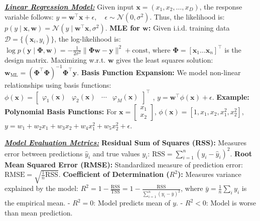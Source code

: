 \documentclass[10pt]{article}
\newcommand{\bulletPoint}[1]{\ul{\textit{\textbf{#1}}}}
\begin{document}
\begin{multicols*}{2}
\bulletPoint{Linear Regression Model:}\quad
Given input $\mathbf{x} = (x_1, x_2, \dots, x_D)$, the response variable follows:
$y = \mathbf{w}^\top \mathbf{x} + \epsilon, \quad \epsilon \sim \mathcal{N}(0, \sigma^2)$.
Thus, the likelihood is:
$p(y \mid \mathbf{x}, \mathbf{w}) = \mathcal{N}(y \mid \mathbf{w}^\top \mathbf{x}, \sigma^2)$. 
\textbf{MLE for $\mathbf{w}$:} Given i.i.d. training data $\mathcal{D} = \{(\mathbf{x}_i, y_i)\}$, the log-likelihood is:
$\log p(\mathbf{y} \mid \mathbf{\Phi}, \mathbf{w}) = -\frac{1}{2\sigma^2} \|\mathbf{\Phi} \mathbf{w} - \mathbf{y} \|^2 + \text{const}$,
where $\mathbf{\Phi} = [\mathbf{x}_1 \dots \mathbf{x}_n]^\top$ is the design matrix.
Maximizing w.r.t. $\mathbf{w}$ gives the least squares solution:
$\mathbf{w}_{\text{ML}} = (\mathbf{\Phi}^\top \mathbf{\Phi})^{-1} \mathbf{\Phi}^\top \mathbf{y}$. 
\textbf{Basis Function Expansion:} We model non-linear relationships using basis functions:
$
\phi(\mathbf{x}) =
\begin{bmatrix}
\varphi_1(\mathbf{x}) & \varphi_2(\mathbf{x}) & \cdots & \varphi_M(\mathbf{x})
\end{bmatrix}^{\top}
$
, \quad
$y = \mathbf{w}^\top \phi(\mathbf{x}) + \epsilon$. 
\textbf{Example: Polynomial Basis Functions:} 
For $\mathbf{x} = \begin{bmatrix} x_1 \\ x_2 \end{bmatrix}$, $\phi(\mathbf{x}) = [1, x_1, x_2, x_1^2, x_2^2]$,
$y = w_1 + w_2 x_1 + w_3 x_2 + w_4 x_1^2 + w_5 x_2^2 + \epsilon$. 


\bulletPoint{Model Evaluation Metrics:}\quad
\textbf{Residual Sum of Squares (RSS):} Measures error between predictions $\hat{y}_i$ and true values $y_i$:
$\text{RSS} = \sum_{i=1}^{n} (y_i - \hat{y}_i)^2$. 
\textbf{Root Mean Squared Error (RMSE):} Standardized measure of prediction error:
$\text{RMSE} = \sqrt{\frac{1}{n} \text{RSS}}$. 
\textbf{Coefficient of Determination ($R^2$):} Measures variance explained by the model:
$R^2 = 1 - \frac{\text{RSS}}{\text{TSS}} = 1 - \frac{\text{RSS}}{\sum_{i=1}^{n} (y_i - \bar{y})^2}$,
where $\bar{y} = \frac{1}{n} \sum_i y_i$ is the empirical mean.
- $R^2 = 0$: Model predicts mean of $y$.
- $R^2 < 0$: Model is worse than mean prediction.


\end{multicols*}
\end{document}
